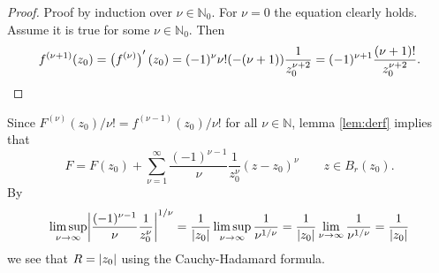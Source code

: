 \begin{enumerate}[label = \textbf{Exercise \arabic*.},wide = 0pt, itemsep=1.5ex]
\begin{enumerate}[label = (\alph*),wide = 0pt, itemsep=1.5ex]
				\begin{proof}
					Proof by induction over $\nu \in \mathbb{N}_0$. For $\nu = 0$ the equation clearly holds. Assume it is true for some $\nu \in \mathbb{N}_0$. Then 
					\begin{equation}
						f^{(\nu + 1)}(z_0) = \del[1]{f^{(\nu)}}'(z_0) = (-1)^\nu \nu! (-(\nu + 1))\frac{1}{z_0^{\nu + 2}} = (-1)^{\nu + 1}\frac{(\nu + 1)!}{z_0^{\nu + 2}}.
					\end{equation}
				\end{proof}

				Since $F^{(\nu)}(z_0)/\nu! = f^{(\nu - 1)}(z_0)/\nu !$ for all $\nu \in \mathbb{N}$, lemma \ref{lem:derf} implies that 
				\begin{equation}
					\boxed{F = F(z_0) + \sum_{\nu = 1}^\infty\frac{(-1)^{\nu - 1}}{\nu}\frac{1}{z_0^\nu} (z - z_0)^\nu \qquad z \in B_r(z_0).}
				\end{equation}
				By
				\begin{equation}
					\limsup_{\nu \to \infty} \abs[3]{\frac{(-1)^{\nu - 1}}{\nu}\frac{1}{z_0^\nu}}^{1/\nu} = \frac{1}{\abs[0]{z_0}}\limsup_{\nu \to \infty}\frac{1}{\nu^{1/\nu}} = \frac{1}{\abs[0]{z_0}}\lim_{\nu \to \infty}\frac{1}{\nu^{1/\nu}} = \frac{1}{\abs[0]{z_0}}
				\end{equation}
				\noindent we see that $R = \abs[0]{z_0}$ using the Cauchy-Hadamard formula.
		\end{enumerate}
\end{enumerate}
\printbibliography

